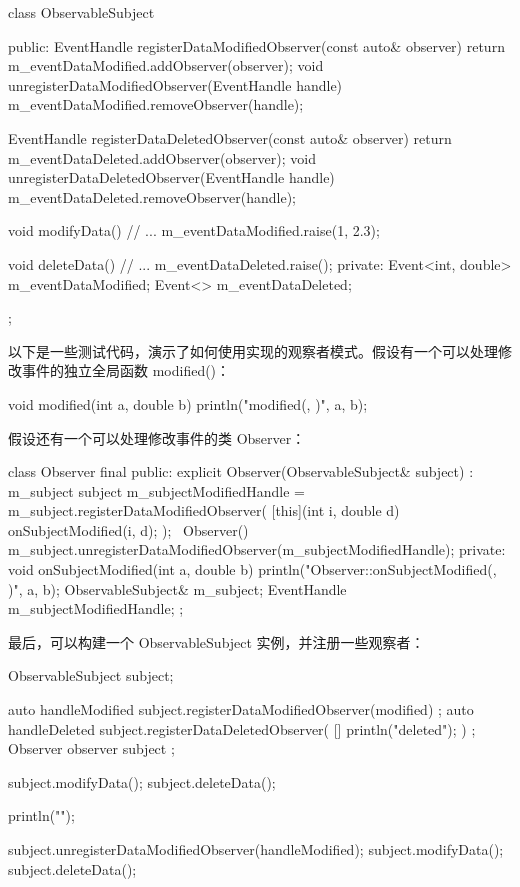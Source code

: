 \begin{cpp}
class ObservableSubject
{
    public:
        EventHandle registerDataModifiedObserver(const auto& observer) {
        return m_eventDataModified.addObserver(observer); }
        void unregisterDataModifiedObserver(EventHandle handle) {
            m_eventDataModified.removeObserver(handle); }

        EventHandle registerDataDeletedObserver(const auto& observer) {
            return m_eventDataDeleted.addObserver(observer); }
        void unregisterDataDeletedObserver(EventHandle handle) {
            m_eventDataDeleted.removeObserver(handle); }

        void modifyData()
        {
            // ...
            m_eventDataModified.raise(1, 2.3);
        }

        void deleteData()
        {
            // ...
            m_eventDataDeleted.raise();
        }
    private:
        Event<int, double> m_eventDataModified;
        Event<> m_eventDataDeleted;
};
\end{cpp}


以下是一些测试代码，演示了如何使用实现的观察者模式。假设有一个可以处理修改事件的独立全局函数 modified()：

\begin{cpp}
void modified(int a, double b) { println("modified({}, {})", a, b); }
\end{cpp}

假设还有一个可以处理修改事件的类 Observer：

\begin{cpp}
class Observer final
{
    public:
        explicit Observer(ObservableSubject& subject) : m_subject { subject }
        {
            m_subjectModifiedHandle = m_subject.registerDataModifiedObserver(
                [this](int i, double d) { onSubjectModified(i, d); });
        }
        ~Observer()
        {
            m_subject.unregisterDataModifiedObserver(m_subjectModifiedHandle);
        }
    private:
        void onSubjectModified(int a, double b)
        {
            println("Observer::onSubjectModified({}, {})", a, b);
        }
        ObservableSubject& m_subject;
        EventHandle m_subjectModifiedHandle;
};
\end{cpp}

最后，可以构建一个 ObservableSubject 实例，并注册一些观察者：

\begin{cpp}
ObservableSubject subject;

auto handleModified { subject.registerDataModifiedObserver(modified) };
auto handleDeleted { subject.registerDataDeletedObserver(
    []{ println("deleted"); }) };
Observer observer { subject };

subject.modifyData();
subject.deleteData();

println("");

subject.unregisterDataModifiedObserver(handleModified);
subject.modifyData();
subject.deleteData();
\end{cpp}

